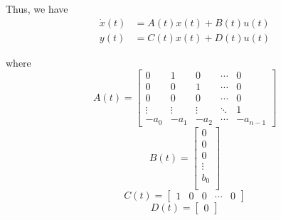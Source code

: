 Thus, we have
\[
    \boxed{
        \begin{aligned}
            \dot{x}(t) & = A(t) x(t) + B(t) u(t) \\
            y(t)       & = C(t) x(t) + D(t) u(t)
        \end{aligned}
    }
\]

where
\[
    A(t) =
    \begin{bmatrix}
        0      & 1      & 0      & \cdots & 0        \\
        0      & 0      & 1      & \cdots & 0        \\
        0      & 0      & 0      & \cdots & 0        \\
        \vdots & \vdots & \vdots & \ddots & 1        \\
        -a_0   & -a_1   & -a_2   & \cdots & -a_{n-1}
    \end{bmatrix}
\]
\[
    B(t) =
    \begin{bmatrix}
        0      \\
        0      \\
        0      \\
        \vdots \\
        b_0    \\
    \end{bmatrix}
\]
\[
    C(t) =
    \begin{bmatrix}
        1 & 0 & 0 & \cdots & 0
    \end{bmatrix}
\]
\[
    D(t) =
    \begin{bmatrix}
        0
    \end{bmatrix}
\]
